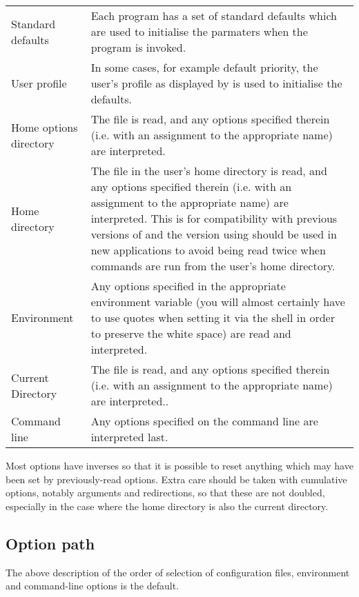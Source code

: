 \begin{tabular}{l p{12cm}}
Standard defaults &
Each program has a set of standard defaults which are used to
initialise the parmaters when the program is invoked.\\
User profile & In some cases, for example default priority, the user's profile as displayed by \PrBtuser{} is used to initialise the defaults.\\
Home options directory & The file \homeconfigpath{} is read, and any options specified therein (i.e. with an assignment to the appropriate
name) are interpreted.\\
Home directory & The file \configurationfile{} in the user's home directory is read, and any options
specified therein (i.e. with an assignment to the appropriate name) are interpreted. This is for compatibility with previous versions of
\ProductName{} and the version using \homeconfigpath{} should be used in new applications to avoid \configurationfile{} being read twice when
commands are run from the user's home directory. \\
Environment &
Any options specified in the appropriate environment variable
(you will almost certainly have to use quotes when setting it via the
shell in order to preserve the white space) are read and interpreted.\\
Current Directory &
The file \configurationfile{} is read, and any options
specified therein (i.e. with an assignment to the appropriate name) are
interpreted.\footnotemark{}. \\
Command line &
Any options specified on the command line are interpreted last.\\
\end{tabular}


Most options have inverses so that it is possible to reset anything which may have been set by previously-read options. Extra care should
be taken with cumulative options, notably arguments and redirections, so that these are not doubled, especially in the case where the home
directory is also the current directory.

\subsection{Option path}
The above description of the order of selection of configuration files, environment and command-line options is the default.


